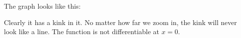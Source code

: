 The graph looks like this:


Clearly it has a kink in it. No matter how far we zoom in,
the kink will never look like a line. The function is
not differentiable at $x=0$.
